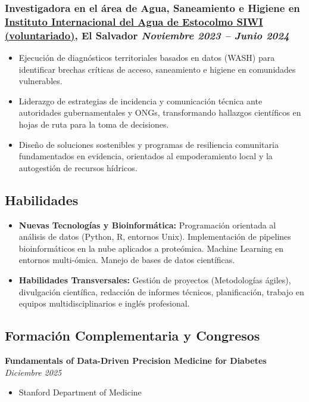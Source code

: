 \documentclass[a4paper,10pt]{article}
\begin{document}
\subsubsection*{%
  \textbf{Investigadora en el área de Agua, Saneamiento e Higiene} en \href{https://www.linkedin.com/company/stockholm-international-water-institute/posts/?feedView=all}{Instituto Internacional del Agua de Estocolmo SIWI (voluntariado)}, El Salvador
  \hfill
  \textit{Noviembre 2023 -- Junio 2024}
}
\begin{itemize}
  \item Ejecución de diagnósticos territoriales basados en datos (WASH) para identificar brechas críticas de acceso, saneamiento e higiene en comunidades vulnerables.
  \item Liderazgo de estrategias de incidencia y comunicación técnica ante autoridades gubernamentales y ONGs, transformando hallazgos científicos en hojas de ruta para la toma de decisiones.
  \item Diseño de soluciones sostenibles y programas de resiliencia comunitaria fundamentados en evidencia, orientados al empoderamiento local y la autogestión de recursos hídricos.
\end{itemize}

\subsection*{Habilidades}
\begin{itemize}
  \item \textbf{Nuevas Tecnologías y Bioinformática:} Programación orientada al análisis de datos (Python, R, entornos Unix). Implementación de pipelines bioinformáticos en la nube aplicados a proteómica. Machine Learning en entornos multi-ómica. Manejo de bases de datos científicas.
  \item \textbf{Habilidades Transversales:} Gestión de proyectos (Metodologías ágiles), divulgación científica, redacción de informes técnicos, planificación, trabajo en equipos multidisciplinarios e inglés profesional.
\end{itemize}

\subsection*{Formación Complementaria y Congresos}

\textbf{Fundamentals of Data-Driven Precision Medicine for Diabetes} \hfill \textit{Diciembre 2025}
\begin{itemize}
    \item Stanford Department of Medicine
\end{itemize}
\end{document}
